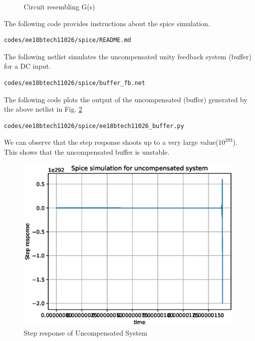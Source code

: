 \begin{enumerate}[label=\arabic*.,ref=\theenumi]
\renewcommand{\thefigure}{\theenumi.\arabic{figure}}
\begin{figure}[!ht]
	\begin{center}
				\resizebox{\columnwidth}{!}{}
	\end{center}
\caption{Circuit resembling G(s)}
\label{fig:ee18btech110026_circuit_2}
\end{figure}
The following code provides instructions about the spice simulation.
\begin{lstlisting}
codes/ee18btech11026/spice/README.md
\end{lstlisting}

The following netlist simulates the uncompensated unity feedback system (buffer) for a DC input.  

\begin{lstlisting}
codes/ee18btech11026/spice/buffer_fb.net
\end{lstlisting}
The following code plots the output of the uncompensated (buffer) generated by the above netlist in Fig. \ref{fig:ee18btech11026_buffer} 
\begin{lstlisting}
codes/ee18btech11026/spice/ee18btech11026_buffer.py
\end{lstlisting}

We can observe that the step response shoots up to a very large value($10^{293}$). This shows that the uncompensated buffer is unstable.
\begin{figure}[!h]
    \centering
    \includegraphics[width=\columnwidth]{./figs/ee18btech11026/ee18btech11026_spice_result_buffer.eps}
    \caption{Step response of Uncompensated System}
    \label{fig:ee18btech11026_buffer}
\end{figure}


\end{enumerate}
